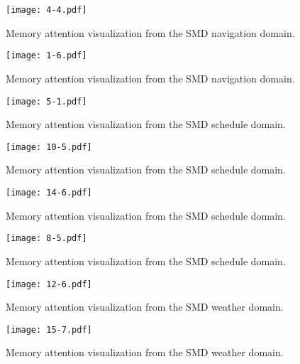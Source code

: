 \documentclass{article} \usepackage{iclr2019_conference,times}
\begin{document}
\begin{figure}[h]
\centering
\texttt{[image: 4-4.pdf]} \caption{Memory attention visualization from the SMD navigation domain.}
\end{figure}

\begin{figure}[h]
\centering
\texttt{[image: 1-6.pdf]} \caption{Memory attention visualization from the SMD navigation domain.}
\end{figure}

\begin{figure}[h]
\centering
\texttt{[image: 5-1.pdf]} \caption{Memory attention visualization from the SMD schedule domain.}
\end{figure}

\begin{figure}[h]
\centering
\texttt{[image: 10-5.pdf]} \caption{Memory attention visualization from the SMD schedule domain.}
\end{figure}

\begin{figure}[h]
\centering
\texttt{[image: 14-6.pdf]} \caption{Memory attention visualization from the SMD schedule domain.}
\end{figure}

\begin{figure}[h]
\centering
\texttt{[image: 8-5.pdf]} \caption{Memory attention visualization from the SMD schedule domain.}
\end{figure}

\begin{figure}[h]
\centering
\texttt{[image: 12-6.pdf]} \caption{Memory attention visualization from the SMD weather domain.}
\setlength{\abovecaptionskip}{-5pt} 
\end{figure}

\begin{figure}[h]
\centering
\texttt{[image: 15-7.pdf]} \caption{Memory attention visualization from the SMD weather domain.}
\setlength{\abovecaptionskip}{-5pt} 
\end{figure}
\end{document}
